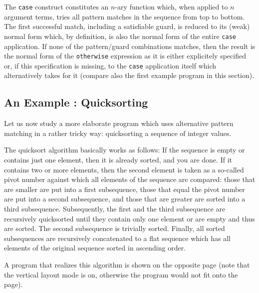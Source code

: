 The {\tt case} construct constitutes an $n$-ary function which, when applied to $n$ argument
terms, tries all pattern matches in the sequence from top to bottom. The first
successful match, including a satisfiable guard, is reduced to its (weak) normal form which,
by definition, is also the normal form of the entire {\tt case} application. If none of the
pattern/guard combinations matches, then the result is the normal form of the
{\tt otherwise} expression as it is either explicitely specified or, if this specification
 is missing, to the {\tt case} application itself which \pired alternatively takes for it (compare
also the first example program in this section).

\subsection{An Example : Quicksorting}
Let us now study a more elaborate program which uses alternative pattern matching in a
rather tricky way: {\mys quicksorting} a sequence of integer values.

The {\mys quicksort algorithm} basically works as follows: If the sequence
is empty or contains just one element, then it is already sorted, and you are done.
If it contains two or more elements, then the second element is taken as a so-called
{\mys pivot number} against which all elements of the sequence are compared: those that are
smaller are put into a first subsequence, those that equal the pivot number are
put into a second subsequence, and those that are greater are sorted into a third 
subsequence. Subsequently, the first and the third subsequence are recursively quicksorted
until they contain only one element or are empty and thus are sorted. The second subsequence is
trivially sorted. Finally, all sorted subsequences are recursively concatenated to a flat
sequence which has all elements of the original sequence  sorted in ascending order. 

A \kir program that realizes this algorithm is shown on the opposite page (note that the vertical layout
mode is on, otherwise the program would not fit onto the page).

